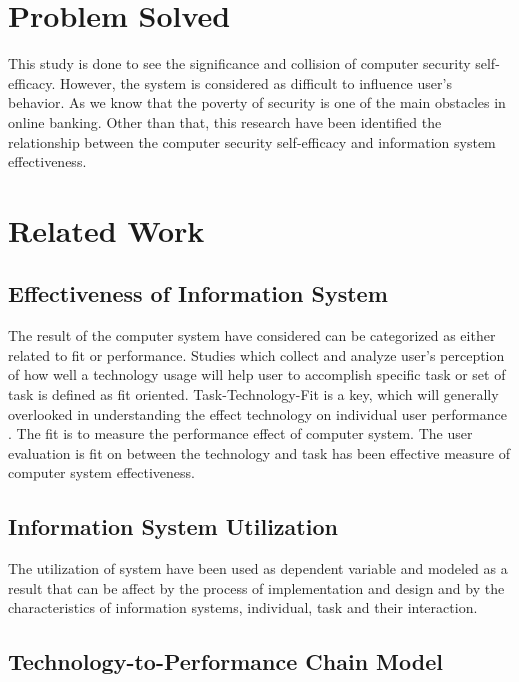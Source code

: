 \documentclass[a4paper, 12pt]{article}
\begin{document}
\section{Problem Solved}

This study is done to see the significance and collision of computer security self-efficacy. However, the system is considered as difficult to influence user’s behavior. As we know that the poverty of security is one of the main obstacles in online banking. Other than that, this research have been identified the relationship between the computer security self-efficacy and information system effectiveness.

\section{Related Work}

\subsection{Effectiveness of Information System}

The result of the computer system have considered can be categorized as either related to fit or performance. Studies which collect and analyze user’s perception of how well a technology usage will help user to accomplish specific task or set of task is defined as fit oriented. Task-Technology-Fit is a key, which will generally overlooked in understanding the effect technology on individual user performance \cite{al2012computer}. The fit is to measure the performance effect of computer system. The user evaluation is fit on between the technology and task has been effective measure of computer system effectiveness.

\subsection{Information System Utilization}

The utilization of system have been used as dependent variable and modeled as a result that can be affect by the process of implementation and design and by the characteristics of information systems, individual, task and their interaction.

\subsection{Technology-to-Performance Chain Model}
\end{document}
